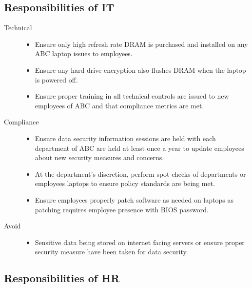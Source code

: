 \documentclass[DIV=calc, paper=a4, fontsize=11pt, twocolumn]{scrartcl}	 %
\begin{document}

\subsection*{Responsibilities of IT}

\begin{description}
  \item[Technical] \hfill
    \begin{itemize}
    \item Ensure only high refresh rate DRAM is purchased and installed
    on any ABC laptop issues to employees.
    \item Ensure any hard drive encryption also flushes DRAM when the
    laptop is powered off.
    \item Ensure proper training in all technical controls are issued to
    new employees of ABC and that compliance metrics are met.
    \end{itemize}
  \item[Compliance] \hfill
    \begin{itemize}
    \item Ensure data security information sessions are held with each
    department of ABC are held at least once a year to update employees
    about new security measures and concerns.
    \item At the department's discretion, perform spot checks of departments
    or employees laptops to ensure policy standards are being met.
    \item Ensure employees properly patch software as needed on laptops as
    patching requires employee presence with BIOS password.
    \end{itemize}
  \item[Avoid] \hfill
   \begin{itemize}
    \item Sensitive data being stored on internet facing
    servers or ensure proper security measure have been taken 
    for data security.
    \end{itemize}
\end{description}

\subsection*{Responsibilities of HR}
\end{document}
